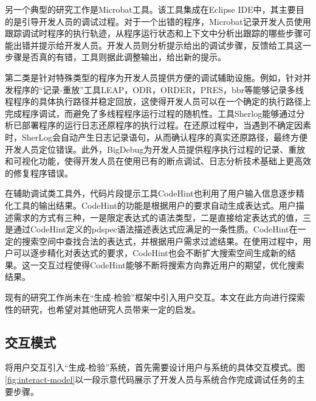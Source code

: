 另一个典型的研究工作是Microbat\cite{microbat}工具。该工具集成在Eclipse IDE中，其主要目的是引导开发人员的调试过程。对于一个出错的程序，Microbat记录开发人员使用跟踪调试时程序的执行轨迹，从程序运行状态和上下文中分析出跟踪的哪些步骤可能出错并提示给开发人员。开发人员则分析提示给出的调试步骤，反馈给工具这一步骤是否真的有错，工具则据此调整输出，给出新的提示。

第二类是针对特殊类型的程序为开发人员提供方便的调试辅助设施。例如，针对并发程序的“记录-重放”工具LEAP\cite{LEAP}，ODR\cite{ODR}，ORDER\cite{ORDER}，PRES\cite{PRES}，bbr\cite{bbr}等能够记录多线程程序的具体执行路径并稳定回放，这使得开发人员可以在一个确定的执行路径上完成程序调试，而避免了多线程程序运行过程的随机性。工具Sherlog\cite{Yuan:2010:SED:1736020.1736038}能够通过分析已部署程序的运行日志还原程序的执行过程。在还原过程中，当遇到不确定因素时，SherLog会自动产生日志记录语句，从而确认程序的真实还原路径，最终方便开发人员定位错误。此外，BigDebug\cite{bigdebug1}\cite{bigdebug2}为开发人员提供程序执行过程的记录、重放和可视化功能，使得开发人员在使用已有的断点调试、日志分析技术基础上更高效的修复程序错误。

在辅助调试类工具外，代码片段提示工具CodeHint\cite{Galenson:2014:CDI:2568225.2568250}也利用了用户输入信息逐步精化工具的输出结果。CodeHint的功能是根据用户的要求自动生成表达式。用户描述需求的方式有三种，一是限定表达式的语法类型，二是直接给定表达式的值，三是通过CodeHint定义的pdspec语法描述表达式应满足的一条性质。CodeHint在一定的搜索空间中查找合法的表达式，并根据用户需求过滤结果。在使用过程中，用户可以逐步精化对表达式的要求，CodeHint也会不断扩大搜索空间生成新的结果。这一交互过程使得CodeHint能够不断将搜索方向靠近用户的期望，优化搜索结果。


现有的研究工作尚未在“生成-检验”框架中引入用户交互。本文在此方向进行探索性的研究，也希望对其他研究人员带来一定的启发。

\subsection{交互模式}%

将用户交互引入“生成-检验”系统，首先需要设计用户与系统的具体交互模式。图\ref{fig:interact-model}以一段示意代码展示了开发人员与系统合作完成调试任务的主要步骤。

